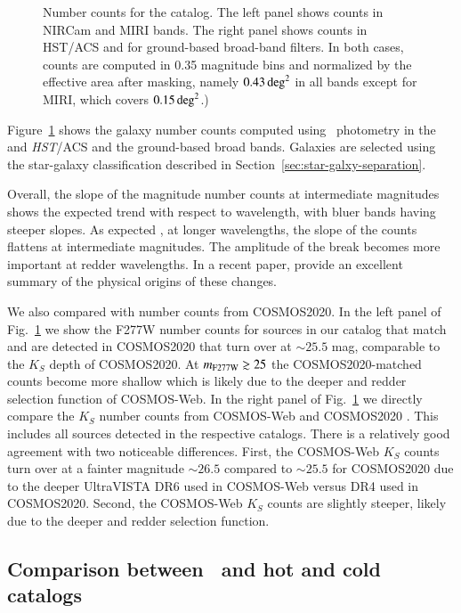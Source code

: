 \documentclass[longauth]{aa}
\begin{document}
\begin{figure}[t!]
\begin{subfigure}[b]{0.42\textwidth}
  \end{subfigure}
 \caption{Number counts for the \SEpp catalog. The left panel shows counts in NIRCam and MIRI bands. The right panel shows counts in HST/ACS and for ground-based broad-band filters. In both cases, counts are computed in 0.35 magnitude bins and normalized by the effective area after masking, namely $0.43\,{\rm deg}^2$ in all bands except for MIRI, which covers $0.15 \, {\rm deg}^2$.)}
  \label{fig:mag-ncounts}
\end{figure}


Figure~\ref{fig:mag-ncounts} shows the galaxy number counts computed using \SEpp\ photometry in the \JWST  and \textit{HST}/ACS and the ground-based broad bands. Galaxies are selected using the star-galaxy classification described in Section~\ref{sec:star-galxy-separation}. 

Overall, the slope of the magnitude number counts at intermediate magnitudes shows the expected trend \citep{metcalfe_galaxy_2001} with respect to wavelength, with bluer bands having steeper slopes. As expected  \citep{1993ApJ...415L...9G}, at longer wavelengths, the slope of the counts flattens at intermediate magnitudes. The amplitude of the break becomes more important at redder wavelengths. In a recent paper, \cite{Manzoni2025} provide an excellent summary of the physical origins of these changes. 



We also compared with number counts from COSMOS2020. In the left panel of Fig.~\ref{fig:mag-ncounts} we show the F277W number counts for sources in our catalog that match and are detected in COSMOS2020 that turn over at $\sim 25.5$ mag, comparable to the $K_S$ depth of COSMOS2020. At $m_{\rm F277W}\gtrsim25$ the COSMOS2020-matched counts become more shallow which is likely due to the deeper and redder selection function of COSMOS-Web. In the right panel of Fig.~\ref{fig:mag-ncounts} we directly compare the $K_S$ number counts from COSMOS-Web and COSMOS2020 \citep[taken from][]{weaver_cosmos2020_2022}. This includes all sources detected in the respective catalogs. There is a relatively good agreement with two noticeable differences. First, the COSMOS-Web $K_{S}$ counts turn over at a fainter magnitude $\sim 26.5$ compared to $\sim25.5$ for COSMOS2020 due to the deeper UltraVISTA DR6 used in COSMOS-Web versus DR4 used in COSMOS2020. Second, the COSMOS-Web $K_{S}$ counts are slightly steeper, likely due to the deeper and redder selection function.

\subsection{Comparison between \SEpp\ and hot and cold catalogs} 
\end{document}
